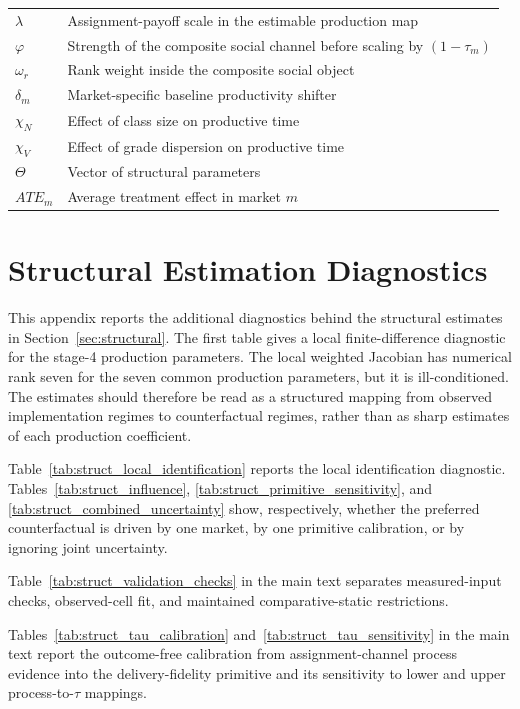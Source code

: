 \documentclass[11pt]{article}
\begin{document}
\begin{longtable}{p{2.5cm}p{11cm}}
$\lambda$ & Assignment-payoff scale in the estimable production map \\
$\varphi$ & Strength of the composite social channel before scaling by $(1-\tau_m)$ \\
$\omega_r$ & Rank weight inside the composite social object \\
$\delta_m$ & Market-specific baseline productivity shifter \\
$\chi_N$ & Effect of class size on productive time \\
$\chi_V$ & Effect of grade dispersion on productive time \\
$\Theta$ & Vector of structural parameters \\
$ATE_m$ & Average treatment effect in market $m$ \\
\bottomrule
\end{longtable}

\section{Structural Estimation Diagnostics}
\label{app:struct_diagnostics}

This appendix reports the additional diagnostics behind the structural estimates in Section~\ref{sec:structural}. The first table gives a local finite-difference diagnostic for the stage-4 production parameters. The local weighted Jacobian has numerical rank seven for the seven common production parameters, but it is ill-conditioned. The estimates should therefore be read as a structured mapping from observed implementation regimes to counterfactual regimes, rather than as sharp estimates of each production coefficient.

Table~\ref{tab:struct_local_identification} reports the local identification diagnostic. Tables~\ref{tab:struct_influence}, \ref{tab:struct_primitive_sensitivity}, and \ref{tab:struct_combined_uncertainty} show, respectively, whether the preferred counterfactual is driven by one market, by one primitive calibration, or by ignoring joint uncertainty.

Table~\ref{tab:struct_validation_checks} in the main text separates measured-input checks, observed-cell fit, and maintained comparative-static restrictions.

Tables~\ref{tab:struct_tau_calibration} and~\ref{tab:struct_tau_sensitivity} in the main text report the outcome-free calibration from assignment-channel process evidence into the delivery-fidelity primitive and its sensitivity to lower and upper process-to-$\tau$ mappings.
\end{document}
